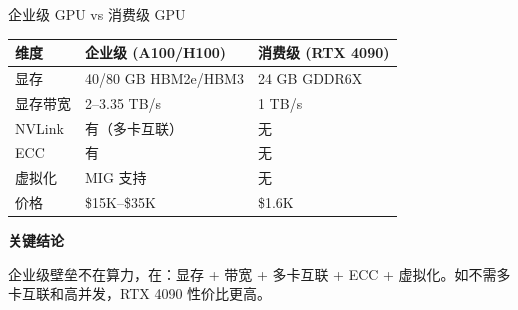 \documentclass[UTF8,11pt,aspectratio=169]{beamer}
\newenvironment{keypoint}{
  \begin{block}{\textbf{关键结论}}
}{
  \end{block}
}
\begin{document}
\begin{frame}{企业级 GPU vs 消费级 GPU}
  \begin{table}
    \centering
    \begin{tabular}{p{2cm}p{4.5cm}p{3.5cm}}
      \toprule
      \textbf{维度}       & \textbf{企业级 (A100/H100)}  & \textbf{消费级 (RTX 4090)} \\
      \midrule
      显存                & 40/80 GB HBM2e/HBM3         & 24 GB GDDR6X               \\
      显存带宽            & 2--3.35 TB/s                 & 1 TB/s                     \\
      NVLink              & 有（多卡互联）              & 无                         \\
      ECC                 & 有                          & 无                         \\
      虚拟化              & MIG 支持                    & 无                         \\
      价格                & \$15K--\$35K                 & \$1.6K                     \\
      \bottomrule
    \end{tabular}
  \end{table}

  \begin{keypoint}
    企业级壁垒不在算力，在：显存 + 带宽 + 多卡互联 + ECC + 虚拟化。如不需多卡互联和高并发，RTX 4090 性价比更高。
  \end{keypoint}
\end{frame}
\end{document}
